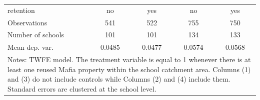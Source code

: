 \documentclass[12pt]{article}
\theoremstyle{plain}
\theoremstyle{plain}
\theoremstyle{plain}
\theoremstyle{definition}
\theoremstyle{plain}
\theoremstyle{definition}
\theoremstyle{plain}
\theoremstyle{remark}
\theoremstyle{definition}
\theoremstyle{definition}
\theoremstyle{plain}
\begin{document}
\begin{table}[H]
{\begin{tabular}{p{9.355em}llll}
    \multicolumn{1}{l}{retention} & \multicolumn{1}{c}{no} & \multicolumn{1}{c}{yes} & \multicolumn{1}{c}{no} & \multicolumn{1}{c}{yes} \\
    \multicolumn{1}{l}{Observations} & \multicolumn{1}{c}{541} & \multicolumn{1}{c}{522} & \multicolumn{1}{c}{755} & \multicolumn{1}{c}{750} \\
    \multicolumn{1}{l}{Number of schools} & \multicolumn{1}{c}{101} & \multicolumn{1}{c}{101} & \multicolumn{1}{c}{134} & \multicolumn{1}{c}{133} \\
    \multicolumn{1}{l}{Mean dep. var.} & \multicolumn{1}{c}{0.0485} & \multicolumn{1}{c}{0.0477} & \multicolumn{1}{c}{0.0574} & \multicolumn{1}{c}{0.0568} \\
    \midrule
    \multicolumn{5}{p{35.935em}}{Notes: TWFE model. The treatment variable is equal to 1 whenever there is at least one reused Mafia property within the school catchment area. Columns (1) and (3) do not include controls while Columns (2) and (4) include them. Standard errors are clustered at the school level.} \\
    \end{tabular}%
    }
\end{table}
\end{document}

